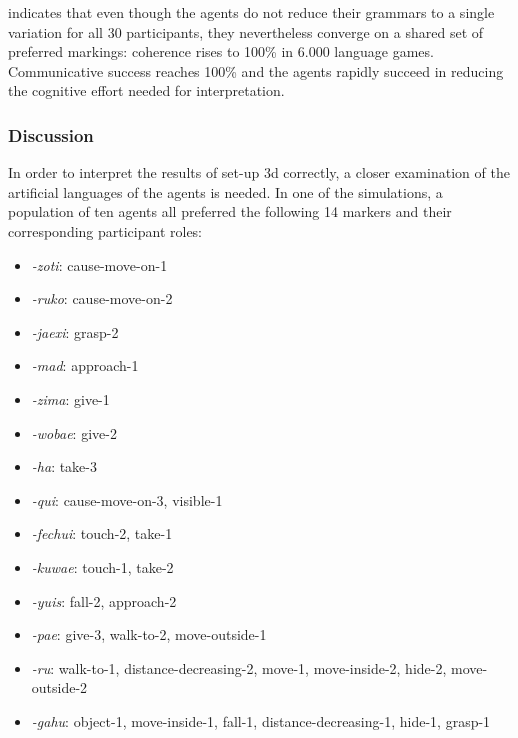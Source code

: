 indicates that even though the agents do not reduce their grammars to a single variation for all 30 participants, they nevertheless converge on a shared set of preferred markings: coherence rises to 100\% in 6.000 language games. Communicative success reaches 100\% and the agents rapidly succeed in reducing the cognitive effort needed for interpretation. 


\subsubsection{Discussion}
 In order to interpret the results of set-up 3d correctly, a closer examination of the artificial languages of the agents is needed. In one of the simulations, a population of ten agents all preferred the following 14 markers and their corresponding participant roles:

\begin{itemize}
\item {\em -zoti}: cause-move-on-1
\item {\em -ruko}: cause-move-on-2
\item {\em -jaexi}: grasp-2
\item {\em -mad}: approach-1
\item {\em -zima}: give-1
\item {\em -wobae}: give-2
\item {\em -ha}: take-3
\item {\em -qui}: cause-move-on-3, visible-1
\item {\em -fechui}: touch-2, take-1
\item {\em -kuwae}: touch-1, take-2
\item {\em -yuis}: fall-2, approach-2
\item {\em -pae}: give-3, walk-to-2, move-outside-1
\item {\em -ru}: walk-to-1, distance-decreasing-2, move-1, move-inside-2, hide-2, move-outside-2
\item {\em -gahu}: object-1, move-inside-1, fall-1, distance-decreasing-1, hide-1, grasp-1
\end{itemize}

